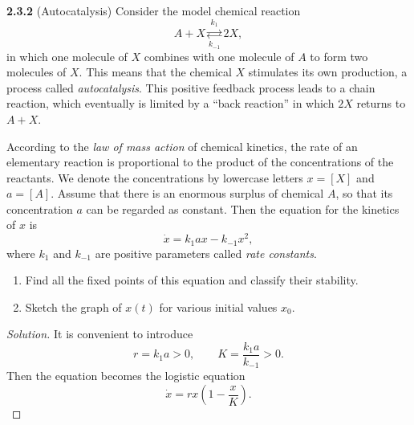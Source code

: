 \documentclass[10pt]{amsart}
\newenvironment{solution}
{\begin{proof}[Solution]}
{\end{proof}}
\begin{document}
\begin{onehalfspace}
        \noindent\textbf{2.3.2} (Autocatalysis)
        Consider the model chemical reaction
        \[
            A+X
            \underset{k_{-1}}{\overset{k_1}{\rightleftarrows}}
            2X,
        \]
        in which one molecule of \(X\) combines with one molecule of \(A\)
        to form two molecules of \(X\). This means that the chemical \(X\)
        stimulates its own production, a process called \emph{autocatalysis}.
        This positive feedback process leads to a chain reaction, which
        eventually is limited by a ``back reaction'' in which \(2X\) returns
        to \(A+X\).

        According to the \emph{law of mass action} of chemical kinetics, the
        rate of an elementary reaction is proportional to the product of the
        concentrations of the reactants. We denote the concentrations by
        lowercase letters \(x=[X]\) and \(a=[A]\). Assume that there is an
        enormous surplus of chemical \(A\), so that its concentration \(a\)
        can be regarded as constant. Then the equation for the kinetics of
        \(x\) is
        \[
            \dot{x}=k_1ax-k_{-1}x^2,
        \]
        where \(k_1\) and \(k_{-1}\) are positive parameters called
        \emph{rate constants}.

        \begin{enumerate}[label=\alph*)]
            \item Find all the fixed points of this equation and classify
            their stability.
            \item Sketch the graph of \(x(t)\) for various initial values
            \(x_0\).
        \end{enumerate}

        \begin{solution}
            It is convenient to introduce
            \[
                r=k_1a>0,
                \qquad
                K=\frac{k_1a}{k_{-1}}>0.
            \]
            Then the equation becomes the logistic equation
            \[
                \dot{x}=rx\left(1-\frac{x}{K}\right).
            \]


\end{solution}
\end{onehalfspace}
\end{document}
